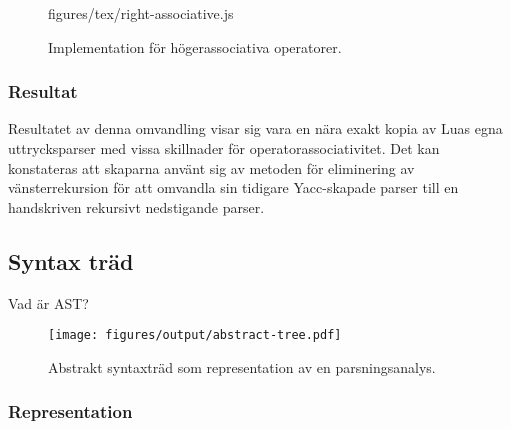 \begin{figure}[ht]
    {figures/tex/right-associative.js}
  \caption{Implementation för högerassociativa operatorer.}
  \label{fig:rightassociative}
\end{figure}

\subsubsection{Resultat}

Resultatet av denna omvandling visar sig vara en nära exakt kopia av Luas egna
uttrycksparser med vissa skillnader för operatorassociativitet. Det kan
konstateras att skaparna använt sig av metoden för eliminering av
vänsterrekursion för att omvandla sin tidigare Yacc-skapade parser till en
handskriven rekursivt nedstigande parser.

%
%
%

%
%

\subsection{Syntax träd}

Vad är AST?

\begin{figure}[ht]
  \texttt{[image: figures/output/abstract-tree.pdf]}
  \caption{Abstrakt syntaxträd som representation av en parsningsanalys.}
\end{figure}

\subsubsection{Representation}

